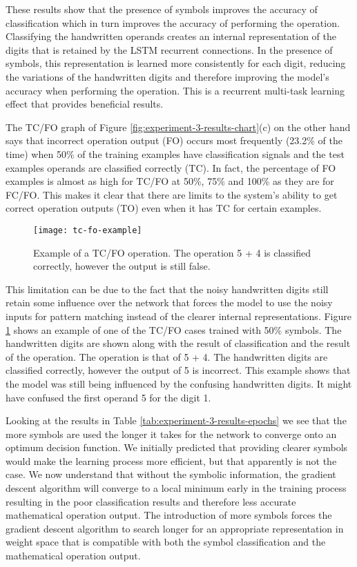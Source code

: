 These results show that the presence of symbols improves the accuracy of classification which in turn improves the accuracy of performing the operation. Classifying the handwritten operands creates an internal representation of the digits that is retained by the LSTM recurrent connections. In the presence of symbols, this representation is learned more consistently for each digit, reducing the variations of the handwritten digits and therefore improving the model's accuracy when performing the operation. This is a recurrent multi-task learning effect that provides beneficial results.

The TC/FO graph of Figure \ref{fig:experiment-3-results-chart}(c) on the other hand says that incorrect operation output (FO) occurs most frequently (23.2\% of the time) when 50\% of the training examples have classification signals and the test examples operands are classified correctly (TC). In fact, the percentage of FO examples is almost as high for TC/FO at 50\%, 75\% and 100\% as they are for FC/FO. This makes it clear that there are limits to the system's ability to get correct operation outputs (TO) even when it has TC for certain examples.

\begin{figure}[t]
	\centering
	\texttt{[image: tc-fo-example]}
	\caption{Example of a TC/FO operation. The operation 5 + 4 is classified correctly, however the output is still false.}
	\label{fig:tc-fo-example}
\end{figure}

This limitation can be due to the fact that the noisy handwritten digits still retain some influence over the network that forces the model to use the noisy inputs for pattern matching instead of the clearer internal representations. Figure \ref{fig:tc-fo-example} shows an example of one of the TC/FO cases trained with 50\% symbols. The handwritten digits are shown along with the result of classification and the result of the operation. The operation is that of 5 + 4. The handwritten digits are classified correctly, however the output of 5 is incorrect. This example shows that the model was still being influenced by the confusing handwritten digits. It might have confused the first operand 5 for the digit 1.

Looking at the results in Table \ref{tab:experiment-3-results-epochs} we see that the more symbols are used the longer it takes for the network to converge onto an optimum decision function. We initially predicted that providing clearer symbols would make the learning process more efficient, but that apparently is not the case. We now understand that without the symbolic information, the gradient descent algorithm will converge to a local minimum early in the training process resulting in the poor classification results and therefore less accurate mathematical operation output. The introduction of more symbols forces the gradient descent algorithm to search longer for an appropriate representation in weight space that is compatible with both the symbol classification and the mathematical operation output.
